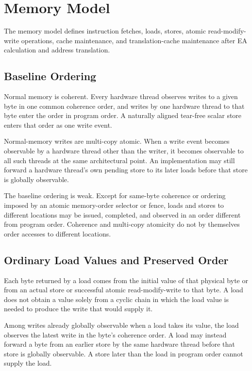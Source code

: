 \clearpage
\section{Memory Model}\label{page:memory-model}

The memory model defines instruction fetches, loads, stores, atomic read-modify-write operations, cache maintenance,
and translation-cache maintenance after EA calculation and address translation.

\subsection{Baseline Ordering}
Normal memory is coherent. Every hardware thread observes writes to a given byte in one common coherence order, and
writes by one hardware thread to that byte enter the order in program order. A naturally aligned tear-free scalar
store enters that order as one write event.

Normal-memory writes are multi-copy atomic. When a write event becomes observable by a hardware thread other than
the writer, it becomes observable to all such threads at the same architectural point. An implementation may still
forward a hardware thread's own pending store to its later loads before that store is globally observable.

The baseline ordering is weak. Except for same-byte coherence or ordering imposed by an atomic memory-order selector
or fence, loads and stores to different locations may be issued, completed, and observed in an order different from
program order. Coherence and multi-copy atomicity do not by themselves order accesses to different locations.

\subsection{Ordinary Load Values and Preserved Order}
Each byte returned by a load comes from the initial value of that physical byte or from an actual store or successful
atomic read-modify-write to that byte. A load does not obtain a value solely from a cyclic chain in which the load
value is needed to produce the write that would supply it.

Among writes already globally observable when a load takes its value, the load observes the latest write in the
byte's coherence order. A load may instead forward a byte from an earlier store by the same hardware thread before
that store is globally observable. A store later than the load in program order cannot supply the load.

